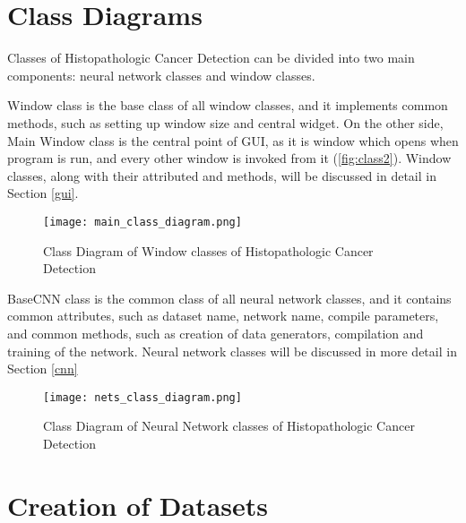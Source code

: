 \section{Class Diagrams}

Classes of Histopathologic Cancer Detection can be divided into two main components: neural network classes and window classes.

Window class is the base class of all window classes, and it implements common methods, such as setting up window size and central widget. On the other side, Main Window class is the central point of GUI, as it is window which opens when program is run, and every other window is invoked from it (\textcolor{red}{\autoref{fig:class2}}). Window classes, along with their attributed and methods, will be discussed in detail in Section \textcolor{red}{\ref{gui}}.

\begin{figure}[h]
	\centering
	\texttt{[image: main\_class\_diagram.png]}
	\caption{Class Diagram of Window classes of Histopathologic Cancer Detection}
	\label{fig:class2}
\end{figure}

\clearpage

BaseCNN class is the common class of all neural network classes, and it contains common attributes, such as dataset name, network name, compile parameters, and common methods, such as creation of data generators, compilation and training of the network. Neural network classes will be discussed in more detail in Section \textcolor{red}{\ref{cnn}}

\begin{figure}[h]
	\centering
	\texttt{[image: nets\_class\_diagram.png]}
	\caption{Class Diagram of Neural Network classes of Histopathologic Cancer Detection}
	\label{fig:class1}
\end{figure}

\section{Creation of Datasets}

